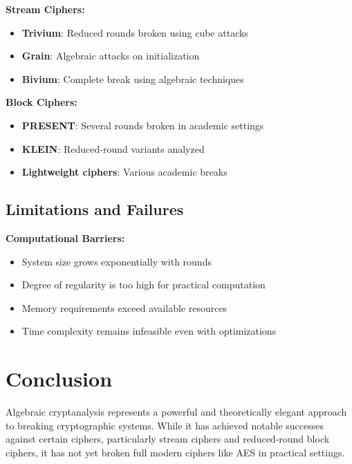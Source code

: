 \documentclass[12pt,a4paper]{article}
\begin{document}
\begin{examplebox}[title=Notable Successes]
\textbf{Stream Ciphers:}
\begin{itemize}
    \item \textbf{Trivium}: Reduced rounds broken using cube attacks
    \item \textbf{Grain}: Algebraic attacks on initialization
    \item \textbf{Bivium}: Complete break using algebraic techniques
\end{itemize}

\textbf{Block Ciphers:}
\begin{itemize}
    \item \textbf{PRESENT}: Several rounds broken in academic settings
    \item \textbf{KLEIN}: Reduced-round variants analyzed
    \item \textbf{Lightweight ciphers}: Various academic breaks
\end{itemize}
\end{examplebox}

\subsection{Limitations and Failures}

\begin{attackbox}[title=Why Full AES Remains Secure]
\textbf{Computational Barriers:}
\begin{itemize}
    \item System size grows exponentially with rounds
    \item Degree of regularity is too high for practical computation
    \item Memory requirements exceed available resources
    \item Time complexity remains infeasible even with optimizations
\end{itemize}
\end{attackbox}

\section{Conclusion}

Algebraic cryptanalysis represents a powerful and theoretically elegant approach to breaking cryptographic systems. While it has achieved notable successes against certain ciphers, particularly stream ciphers and reduced-round block ciphers, it has not yet broken full modern ciphers like AES in practical settings.
\end{document}

